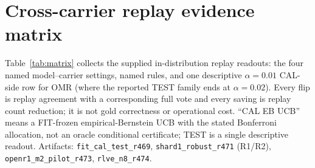 \documentclass{article}
\theoremstyle{definition}
\theoremstyle{remark}
\begin{document}
\section{Cross-carrier replay evidence matrix}
\label{app:matrix}
Table~\ref{tab:matrix} collects the supplied in-distribution replay readouts:
the four named model--carrier settings, named rules, and one descriptive
$\alpha{=}0.01$ CAL-side row for OMR (where the reported TEST family ends at
$\alpha{=}0.02$). Every flip is replay agreement with a corresponding full
vote and every saving is replay count reduction; it is not gold correctness or
operational cost. ``CAL EB UCB'' means a FIT-frozen empirical-Bernstein UCB
with the stated Bonferroni allocation, not an oracle conditional certificate;
TEST is a single descriptive readout.
Artifacts: \texttt{fit\_cal\_test\_r469}, \texttt{shard1\_robust\_r471}
(R1/R2), \texttt{openr1\_m2\_pilot\_r473}, \texttt{rlve\_n8\_r474}.
\end{document}
